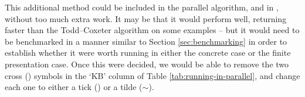 This additional method could be included in the parallel algorithm, and in
\libsemigroups{}, without too much extra work.  It may be that it would perform
well, returning faster than the Todd--Coxeter algorithm on some examples -- but it would need
to be benchmarked in a manner similar to Section \ref{sec:benchmarking} in order
to establish whether it were worth running in either the concrete case or the
finite presentation case.  Once this were decided, we would be able to remove the
two cross (\xmark) symbols in the `KB' column of Table
\ref{tab:running-in-parallel}, and change each one to either a tick (\cmark) or
a tilde ($\sim$).
